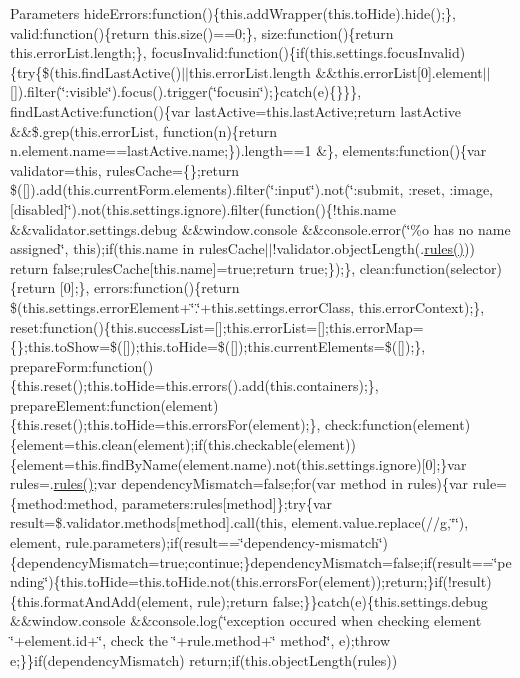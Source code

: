 \begin{DoxyParams}{Parameters}
hide\+Errors\+:function()\{this.\+add\+Wrapper(this.\+to\+Hide).hide();\}, valid\+:function()\{return this.\+size()==0;\}, size\+:function()\{return this.\+error\+List.\+length;\}, focus\+Invalid\+:function()\{if(this.\+settings.\+focus\+Invalid)\{try\{\$(this.\+find\+Last\+Active()$\vert$$\vert$this.error\+List.\+length \&\&this.\+error\+List\mbox{[}0\mbox{]}.element$\vert$$\vert$\mbox{[}\mbox{]}).filter(\char`\"{}\+:visible\char`\"{}).focus().trigger(\char`\"{}focusin\char`\"{});\}catch(e)\{\}\}\}, find\+Last\+Active\+:function()\{var last\+Active=this.\+last\+Active;return last\+Active \&\&\$.grep(this.\+error\+List, function(n)\{return n.\+element.\+name==last\+Active.\+name;\}).length==1 \&\}, elements\+:function()\{var validator=this, rules\+Cache=\{\};return \$(\mbox{[}\mbox{]}).add(this.\+current\+Form.\+elements).filter(\char`\"{}\+:input\char`\"{}).not(\char`\"{}\+:submit, \+:reset, \+:image, \mbox{[}disabled\mbox{]}\char`\"{}).not(this.\+settings.\+ignore).filter(function()\{!this.name \&\&validator.\+settings.\+debug \&\&window.\+console \&\&console.\+error(\char`\"{}\%o has no name assigned\char`\"{}, this);if(this.\+name in rules\+Cache$\vert$$\vert$!validator.object\+Length(.\hyperlink{obj_2_release_2_package_2_package_tmp_2_scripts_2respond_8js_ada87c2e257bc5ff6e77cdbc23ed986a3}{rules()})) return false;rules\+Cache\mbox{[}this.\+name\mbox{]}=true;return true;\});\}, clean\+:function(selector)\{return \mbox{[}0\mbox{]};\}, errors\+:function()\{return \$(this.\+settings.\+error\+Element+\char`\"{}.\char`\"{}+this.settings.\+error\+Class, this.\+error\+Context);\}, reset\+:function()\{this.\+success\+List=\mbox{[}\mbox{]};this.\+error\+List=\mbox{[}\mbox{]};this.\+error\+Map=\{\};this.\+to\+Show=\$(\mbox{[}\mbox{]});this.\+to\+Hide=\$(\mbox{[}\mbox{]});this.\+current\+Elements=\$(\mbox{[}\mbox{]});\}, prepare\+Form\+:function()\{this.\+reset();this.\+to\+Hide=this.\+errors().add(this.\+containers);\}, prepare\+Element\+:function(element)\{this.\+reset();this.\+to\+Hide=this.\+errors\+For(element);\}, check\+:function(element)\{element=this.\+clean(element);if(this.\+checkable(element))\{element=this.\+find\+By\+Name(element.\+name).not(this.\+settings.\+ignore)\mbox{[}0\mbox{]};\}var rules=.\hyperlink{obj_2_release_2_package_2_package_tmp_2_scripts_2respond_8js_ada87c2e257bc5ff6e77cdbc23ed986a3}{rules()};var dependency\+Mismatch=false;for(var method in rules)\{var rule=\{method\+:method, parameters\+:rules\mbox{[}method\mbox{]}\};try\{var result=\$.validator.\+methods\mbox{[}method\mbox{]}.call(this, element.\+value.\+replace(//g,\char`\"{}\char`\"{}), element, rule.\+parameters);if(result==\char`\"{}dependency-\/mismatch\char`\"{})\{dependency\+Mismatch=true;continue;\}dependency\+Mismatch=false;if(result==\char`\"{}pending\char`\"{})\{this.\+to\+Hide=this.\+to\+Hide.\+not(this.\+errors\+For(element));return;\}if(!result)\{this.\+format\+And\+Add(element, rule);return false;\}\}catch(e)\{this.\+settings.\+debug \&\&window.\+console \&\&console.\+log(\char`\"{}exception occured when checking element \char`\"{}+element.id+\char`\"{}, check the \textquotesingle{}\char`\"{}+rule.method+\char`\"{}\textquotesingle{} method\char`\"{}, e);throw e;\}\}if(dependency\+Mismatch) return;if(this.\+object\+Length(rules)) 
\end{DoxyParams}
